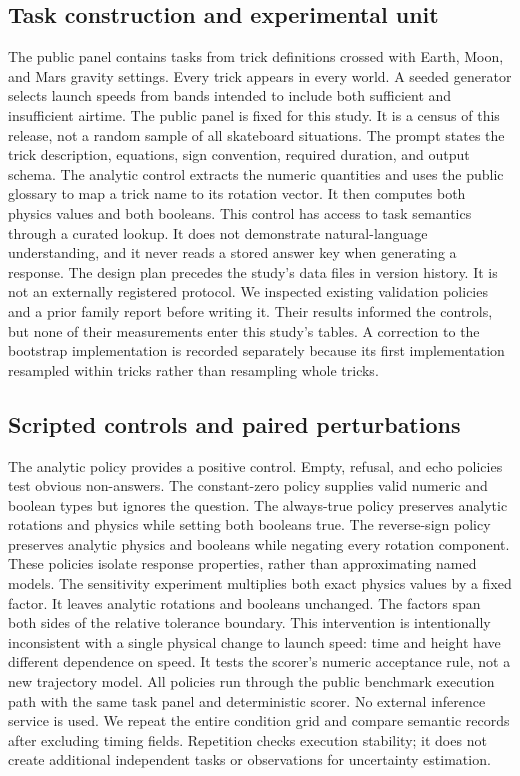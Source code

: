 \documentclass{article}
\begin{document}
\subsection{Task construction and experimental unit}
The public panel contains \TaskCount{} tasks from \TrickCount{} trick definitions crossed with Earth, Moon, and Mars gravity settings. Every trick appears in every world. A seeded generator selects launch speeds from bands intended to include both sufficient and insufficient airtime. The public panel is fixed for this study. It is a census of this release, not a random sample of all skateboard situations.
The prompt states the trick description, equations, sign convention, required duration, and output schema. The analytic control extracts the numeric quantities and uses the public glossary to map a trick name to its rotation vector. It then computes both physics values and both booleans. This control has access to task semantics through a curated lookup. It does not demonstrate natural-language understanding, and it never reads a stored answer key when generating a response.
The design plan precedes the study's data files in version history. It is not an externally registered protocol. We inspected existing validation policies and a prior family report before writing it. Their results informed the controls, but none of their measurements enter this study's tables. A correction to the bootstrap implementation is recorded separately because its first implementation resampled within tricks rather than resampling whole tricks.
\subsection{Scripted controls and paired perturbations}
The analytic policy provides a positive control. Empty, refusal, and echo policies test obvious non-answers. The constant-zero policy supplies valid numeric and boolean types but ignores the question. The always-true policy preserves analytic rotations and physics while setting both booleans true. The reverse-sign policy preserves analytic physics and booleans while negating every rotation component. These policies isolate response properties, rather than approximating named models.
The sensitivity experiment multiplies both exact physics values by a fixed factor. It leaves analytic rotations and booleans unchanged. The factors span both sides of the relative tolerance boundary. This intervention is intentionally inconsistent with a single physical change to launch speed: time and height have different dependence on speed. It tests the scorer's numeric acceptance rule, not a new trajectory model.
All policies run through the public benchmark execution path with the same task panel and deterministic scorer. No external inference service is used. We repeat the entire condition grid and compare semantic records after excluding timing fields. Repetition checks execution stability; it does not create additional independent tasks or observations for uncertainty estimation.
\end{document}
